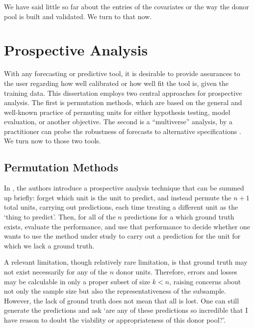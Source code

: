 \documentclass{uiucthesis2021}
\theoremstyle{definition}
\begin{document}
We have said little so far about the entries of the covariates or the way the donor pool is built and validated.  We turn to that now.

\section{Prospective Analysis}
With any forecasting or predictive tool, it is desirable to provide assurances to the user regarding how well calibrated or how well fit the tool is, given the training data.  This dissertation employs two central approaches for prospective analysis.  The first is permutation methods, which are based on the general and well-known practice of permuting units for either hypothesis testing, model evaluation, or another objective.  The second is a ``multiverse'' analysis, by a practitioner can probe the robustness of forecasts to alternative specifications \cite[][]{steegen2016increasing}.  We turn now to those two tools.
\subsection{Permutation Methods}

In \cite[][]{lin2021minimizing}, the authors introduce a prospective analysis technique that can be summed up briefly: forget which unit is the unit to predict, and instead permute the $n+1$ total units, carrying out predictions, each time treating a different unit as the `thing to predict'.  Then, for all of the $n$ predictions for a which ground truth exists, evaluate the performance, and use that performance to decide whether one wants to use the method under study to carry out a prediction for the unit for which we lack a ground truth.

A relevant limitation, though relatively rare limitation, is that ground truth may not exist necessarily for any of the $n$ donor units. Therefore, errors and losses may be calculable in only a proper subset of size $k < n$, raising concerns about not only the sample size but also the representativeness of the subsample.  However, the lack of ground truth does not mean that all is lost.  One can still generate the predictions and ask `are any of these predictions so incredible that I have reason to doubt the viability or appropriateness of this donor pool?'.
\end{document}
